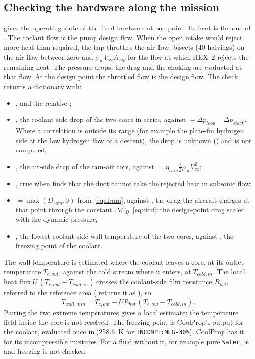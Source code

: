 \documentclass[a4paper,11pt]{article}
\begin{document}
\subsection{Checking the hardware along the mission}\label{sec:check}
 gives the operating state of the fixed hardware at one
point. Its heat is the one of . The coolant flow is the pump design flow. When
the open intake would reject more heat than required, the flap throttles the air flow:
 bisects (40 halvings) on the air flow between zero and
$\rho_\infty V_\infty A_{cap}$ for the flow at which HEX~2 rejects the remaining heat. The
pressure drops, the drag and the choking are evaluated at that flow. At the design point the
throttled flow is the design flow. The check returns a dictionary with:
\begin{itemize}
\item {},  and the relative ;
\item {}, the coolant-side drop of the two cores in series, against
   $= \Delta p_{loop} - \Delta p_{stack}$. Where a correlation
  is outside its range (for example the plate-fin hydrogen side at the low hydrogen flow of
  a descent), the drop is unknown () and is not compared;
\item {}, the air-side drop of the ram-air core, against
   $= \eta_{ram}\tfrac12\rho_\infty V_\infty^2$;
\item {}, true when  finds that the duct cannot take the
  rejected heat in subsonic flow;
\item {} $= \max(D_{ram}, 0)$ from~\eqref{eq:dram}, against
  , the drag the aircraft charges at that point through the
  constant $\Delta C_D$~\eqref{eq:dcd}: the design-point drag scaled with the dynamic
  pressure;
\item {}, the lowest coolant-side wall temperature of the two cores, against
  , the freezing point of the coolant.
\end{itemize}
The wall temperature is estimated where the coolant leaves a core, at its outlet temperature
$T_{c,out}$, against the cold stream where it enters, at $T_{cold,in}$. The local heat flux
$U\,(T_{c,out} - T_{cold,in})$ crosses the coolant-side film resistance $R_{hot}$, referred
to the reference area ( returns it as ), so
\begin{equation}
  T_{wall,min} = T_{c,out} - U R_{hot}\,(T_{c,out} - T_{cold,in}).
  \label{eq:twall}
\end{equation}
Pairing the two extreme temperatures gives a local estimate; the temperature field inside the
core is not resolved. The freezing point is CoolProp's  output for the
coolant, evaluated once in  (\SI{258.6}{K} for \texttt{INCOMP::MEG-30\%}).
CoolProp has it for its incompressible mixtures. For a fluid without it, for example pure
\texttt{Water},  is  and freezing is not checked.
\end{document}
